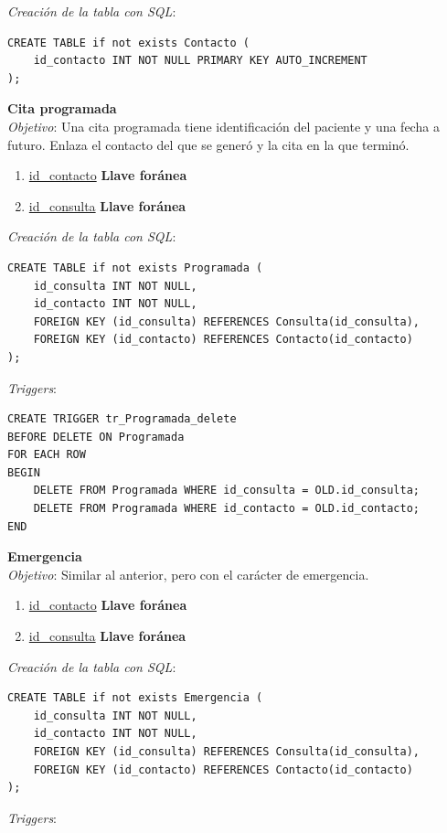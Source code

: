 \documentclass[a4paper,12pt]{article}
\begin{document}
\emph{Creación de la tabla con SQL}: 
\begin{verbatim}
CREATE TABLE if not exists Contacto (
	id_contacto INT NOT NULL PRIMARY KEY AUTO_INCREMENT
);
\end{verbatim}

\textbf{Cita programada} \\ \emph{Objetivo}: Una cita programada tiene identificación del paciente y una fecha a futuro. Enlaza el contacto del que se generó y la cita en la que terminó.
\begin{enumerate}
	\item \underline{id\_contacto} \textbf{Llave foránea}
	\item \underline{id\_consulta} \textbf{Llave foránea}
\end{enumerate}

\emph{Creación de la tabla con SQL}: 
\begin{verbatim}
CREATE TABLE if not exists Programada (
	id_consulta INT NOT NULL,
	id_contacto INT NOT NULL,
	FOREIGN KEY (id_consulta) REFERENCES Consulta(id_consulta),
	FOREIGN KEY (id_contacto) REFERENCES Contacto(id_contacto)
);
\end{verbatim}

\emph{Triggers}: 

\begin{verbatim}
CREATE TRIGGER tr_Programada_delete
BEFORE DELETE ON Programada
FOR EACH ROW
BEGIN
    DELETE FROM Programada WHERE id_consulta = OLD.id_consulta;
    DELETE FROM Programada WHERE id_contacto = OLD.id_contacto;
END
\end{verbatim}


\textbf{Emergencia} \\ \emph{Objetivo}: Similar al anterior, pero con el carácter de emergencia.
\begin{enumerate}
	\item \underline{id\_contacto} \textbf{Llave foránea}
	\item \underline{id\_consulta} \textbf{Llave foránea}
\end{enumerate}

\emph{Creación de la tabla con SQL}: 
\begin{verbatim}
CREATE TABLE if not exists Emergencia (
	id_consulta INT NOT NULL,
	id_contacto INT NOT NULL,
	FOREIGN KEY (id_consulta) REFERENCES Consulta(id_consulta),
	FOREIGN KEY (id_contacto) REFERENCES Contacto(id_contacto)
);
\end{verbatim}

\emph{Triggers}: 
\end{document}
